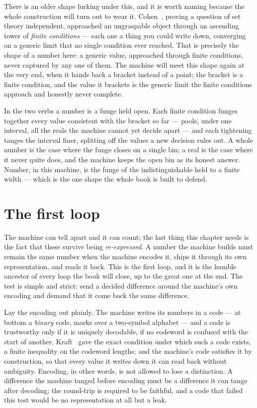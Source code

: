 There is an older shape lurking under this, and it is worth naming because the whole construction will turn out to wear
it. Cohen~\cite{cohen1963}, proving a question of set theory independent, approached an ungraspable object through an
ascending tower of \emph{finite conditions} --- each one a thing you could write down, converging on a generic limit
that no single condition ever reached. That is precisely the shape of a number here: a generic value, approached
through finite conditions, never captured by any one of them. The machine will meet this shape again at the very end,
when it hands back a bracket instead of a point; the bracket is a finite condition, and the value it brackets is the
generic limit the finite conditions approach and honestly never complete.

In the two verbs a number is a funge held open. Each finite condition funges together every value consistent with the
bracket so far --- pools, under one interval, all the reals the machine cannot yet decide apart --- and each tightening
tanges the interval finer, splitting off the values a new decision rules out. A whole number is the case where the
funge closes on a single bin; a real is the case where it never quite does, and the machine keeps the open bin as its
honest answer. Number, in this machine, is the funge of the indistinguishable held to a finite width --- which is the
one shape the whole book is built to defend.

\section{The first loop}

The machine can tell apart and it can count; the last thing this chapter needs is the fact that these survive being
\emph{re-expressed}. A number the machine builds must remain the same number when the machine encodes it, ships it
through its own representation, and reads it back. This is the first loop, and it is the humble ancestor of every loop
the book will close, up to the great one at the end. The test is simple and strict: send a decided difference around the
machine's own encoding and demand that it come back the same difference.

Lay the encoding out plainly. The machine writes its numbers in a code --- at bottom a \emph{binary} code, marks over a
two-symbol alphabet --- and a code is trustworthy only if it is uniquely decodable, if no codeword is confused with the
start of another. Kraft~\cite{kraft1949} gave the exact condition under which such a code exists, a finite inequality on
the codeword lengths; and the machine's code satisfies it by construction, so that every value it writes down it can
read back without ambiguity. Encoding, in other words, is not allowed to lose a distinction. A difference the machine
tanged before encoding must be a difference it can tange after decoding; the round-trip is required to be faithful, and
a code that failed this test would be no representation at all but a leak.


